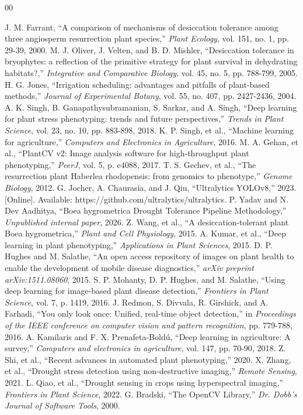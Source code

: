 \documentclass[conference]{IEEEtran}
\begin{document}
\begin{thebibliography}{00}

 J. M. Farrant, ``A comparison of mechanisms of desiccation tolerance among three angiosperm resurrection plant species,'' \textit{Plant Ecology}, vol. 151, no. 1, pp. 29-39, 2000.  
 M. J. Oliver, J. Velten, and B. D. Mishler, ``Desiccation tolerance in bryophytes: a reflection of the primitive strategy for plant survival in dehydrating habitats?,'' \textit{Integrative and Comparative Biology}, vol. 45, no. 5, pp. 788-799, 2005.  
 H. G. Jones, ``Irrigation scheduling: advantages and pitfalls of plant-based methods,'' \textit{Journal of Experimental Botany}, vol. 55, no. 407, pp. 2427-2436, 2004.  
 A. K. Singh, B. Ganapathysubramanian, S. Sarkar, and A. Singh, ``Deep learning for plant stress phenotyping: trends and future perspectives,'' \textit{Trends in Plant Science}, vol. 23, no. 10, pp. 883-898, 2018.  
 K. P. Singh, et al., ``Machine learning for agriculture,'' \textit{Computers and Electronics in Agriculture}, 2016.  
 M. A. Gehan, et al., ``PlantCV v2: Image analysis software for high-throughput plant phenotyping,'' \textit{PeerJ}, vol. 5, p. e4088, 2017.  
 T. S. Gechev, et al., ``The resurrection plant Haberlea rhodopensis: from genomics to phenotype,'' \textit{Genome Biology}, 2012.  
 G. Jocher, A. Chaurasia, and J. Qiu, ``Ultralytics YOLOv8,'' 2023. [Online]. Available: https://github.com/ultralytics/ultralytics.  
 P. Yadav and N. Dev Aadhitya, ``Boea hygrometrica Drought Tolerance Pipeline Methodology,'' \textit{Unpublished internal paper}, 2026.  
 Z. Wang, et al., ``A desiccation-tolerant plant Boea hygrometrica,'' \textit{Plant and Cell Physiology}, 2015.  
 A. Kumar, et al., ``Deep learning in plant phenotyping,'' \textit{Applications in Plant Sciences}, 2015.  
 D. P. Hughes and M. Salathe, ``An open access repository of images on plant health to enable the development of mobile disease diagnostics,'' \textit{arXiv preprint arXiv:1511.08060}, 2015.  
 S. P. Mohanty, D. P. Hughes, and M. Salathe, ``Using deep learning for image-based plant disease detection,'' \textit{Frontiers in Plant Science}, vol. 7, p. 1419, 2016.  
 J. Redmon, S. Divvala, R. Girshick, and A. Farhadi, ``You only look once: Unified, real-time object detection,'' in \textit{Proceedings of the IEEE conference on computer vision and pattern recognition}, pp. 779-788, 2016.  
 A. Kamilaris and F. X. Prenafeta-Boldú, ``Deep learning in agriculture: A survey,'' \textit{Computers and electronics in agriculture}, vol. 147, pp. 70-90, 2018.  
 Z. Shi, et al., ``Recent advances in automated plant phenotyping,'' 2020.  
 X. Zhang, et al., ``Drought stress detection using non-destructive imaging,'' \textit{Remote Sensing}, 2021.  
 L. Qiao, et al., ``Drought sensing in crops using hyperspectral imaging,'' \textit{Frontiers in Plant Science}, 2022.  
 G. Bradski, ``The OpenCV Library,'' \textit{Dr. Dobb's Journal of Software Tools}, 2000.  

\end{thebibliography}
\end{document}
